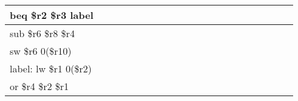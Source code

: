 \documentclass[a4paper,10pt]{article}
\begin{document}
\begin{enumerate}
{\begin{table}[!hbpt]
\begin{tabular}{|l|c|c|c|c|c|c|c|c|c|c|c|c|c|c|c|c|c|l|l|l|}
            beq \$r2 \$r3 label    &                        &                        &                        &                        &                        &                        &                        &                        &                        &                         &                         &                         &                         &                         &                         &                         &                         &    &    &    \\ \hline
            sub \$r6 \$r8 \$r4     &                        &                        &                        &                        &                        &                        &                        &                        &                        &                         &                         &                         &                         &                         &                         &                         &                         &    &    &    \\ \hline
            sw \$r6 0(\$r10)       &                        &                        &                        &                        &                        &                        &                        &                        &                        &                         &                         &                         &                         &                         &                         &                         &                         &    &    &    \\ \hline
            label: lw \$r1 0(\$r2) &                        &                        &                        &                        &                        &                        &                        &                        &                        &                         &                         &                         &                         &                         &                         &                         &                         &    &    &    \\ \hline
            or \$r4 \$r2 \$r1      &                        &                        &                        &                        &                        &                        &                        &                        &                        &                         &                         &                         &                         &                         &                         &                         &                         &    &    &    \\ \hline
            \end{tabular}
        \end{table}
        
    }
\end{enumerate}
\end{document}

